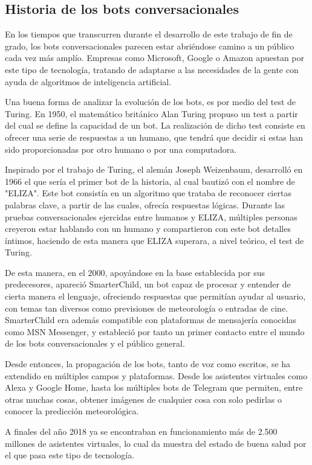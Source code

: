 \subsection{Historia de los bots conversacionales}

\noindent En los tiempos que transcurren durante el desarrollo de este trabajo de fin de grado, los bots conversacionales parecen estar abriéndose camino a un público cada vez más amplío. Empresas como Microsoft, Google o Amazon apuestan por este tipo de tecnología, tratando de adaptarse a las necesidades de la gente con ayuda de algoritmos de inteligencia artificial.

Una buena forma de analizar la evolución de los bots, es por medio del test de Turing. En 1950, el matemático británico Alan Turing propuso un test a partir del cual se define la capacidad de un bot. La realización de dicho test consiste en ofrecer una serie de respuestas a un humano, que tendrá que decidir si estas han sido proporcionadas por otro humano o por una computadora.

Inspirado por el trabajo de Turing, el alemán Joseph Weizenbaum, desarrolló en 1966 el que sería el primer bot de la historia, al cual bautizó con el nombre de "ELIZA". Este bot consistía en un algoritmo que trataba de reconocer ciertas palabras clave, a partir de las cuales, ofrecía respuestas lógicas. Durante las pruebas conversacionales ejercidas entre humanos y ELIZA, múltiples personas creyeron estar hablando con un humano y compartieron con este bot detalles íntimos, haciendo de esta manera que ELIZA superara, a nivel teórico, el test de Turing.

De esta manera, en el 2000, apoyándose en la base establecida por sus predecesores, apareció SmarterChild, un bot capaz de procesar y entender de cierta manera el lenguaje, ofreciendo respuestas que permitían ayudar al usuario, con temas tan diversos como previsiones de meteorología o entradas de cine. SmarterChild era además compatible con plataformas de mensajería conocidas como MSN Messenger, y estableció por tanto un primer contacto entre el mundo de los bots conversacionales y el público general.

Desde entonces, la propagación de los bots, tanto de voz como escritos, se ha extendido en múltiples campos y plataformas. Desde los asistentes virtuales como Alexa y Google Home, hasta los múltiples bots de Telegram\cite{elenasantos2018} que permiten, entre otras muchas cosas, obtener imágenes de cualquier cosa con solo pedirlas o conocer la predicción meteorológica.

A finales del año 2018 ya se encontraban en funcionamiento\cite{albertoiglesiasfraga2019} más de 2.500 millones de asistentes virtuales, lo cual da muestra del estado de buena salud por el que pasa este tipo de tecnología.
